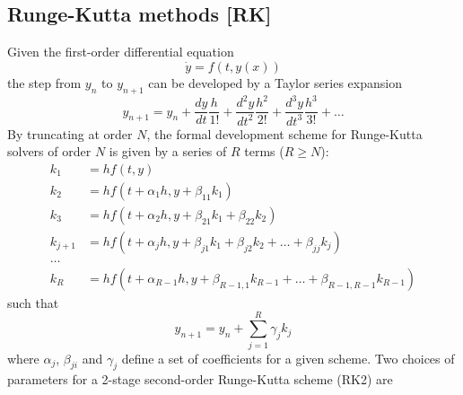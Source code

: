 \documentclass[Orbiter Technical Reference.tex]{subfiles}
\begin{document}
\subsection{Runge-Kutta methods [RK]}\label{ssec:rk}
Given the first-order differential equation
\begin{equation}\label{eq:firstorder}
\dot{y} = f(t,y(x))
\end{equation}
the step from $y_n$ to $y_{n+1}$ can be developed by a Taylor series expansion
\begin{equation*}
y_{n+1} = y_n + \frac{dy}{dt}\frac{h}{1!} + \frac{d^2y}{dt^2}\frac{h^2}{2!} + \frac{d^3y}{dt^3}\frac{h^3}{3!} + \ldots
\end{equation*}
By truncating at order $N$, the formal development scheme for Runge-Kutta solvers of order $N$ is given by a series of $R$ terms ($R \geq N$):
\begin{equation}\label{eq:rk_term}
\begin{split}
k_1 &= h f(t,y) \\
k_2 &= h f(t+\alpha_1 h, y+\beta_{11} k_1) \\
k_3 &= h f(t+\alpha_2 h, y+\beta_{21} k_1+\beta_{22} k_2) \\
k_{j+1} &= h f(t+\alpha_j h, y+\beta_{j1} k_1 + \beta_{j2} k_2 + \ldots + \beta_{jj} k_j) \\
\ldots \\
k_R &= h f(t+\alpha_{R-1} h, y+\beta_{R-1,1} k_{R-1} + \ldots + \beta_{R-1,R-1} k_{R-1})
\end{split}
\end{equation}
such that
\begin{equation*}
y_{n+1} = y_n + \sum_{j=1}^R \gamma_j k_j
\end{equation*}
where $\alpha_j$, $\beta_{ji}$ and $\gamma_j$ define a set of coefficients for a given scheme.
Two choices of parameters for a 2-stage second-order Runge-Kutta scheme (RK2) are
\end{document}

